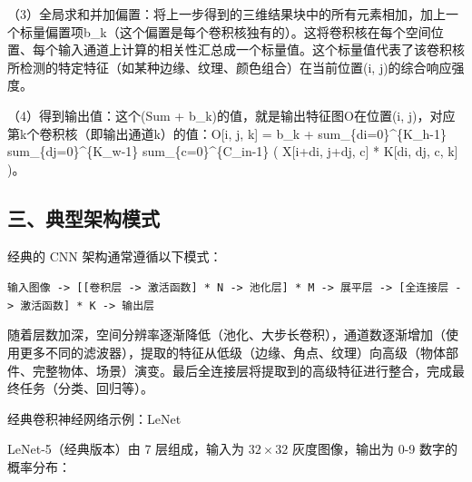（3）全局求和并加偏置：将上一步得到的三维结果块中的所有元素相加，加上一个标量偏置项b\_k（这个偏置是每个卷积核独有的）。这将卷积核在每个空间位置、每个输入通道上计算的相关性汇总成一个标量值。这个标量值代表了该卷积核所检测的特定特征（如某种边缘、纹理、颜色组合）在当前位置(i, j)的综合响应强度。

（4）得到输出值：这个(Sum + b\_k)的值，就是输出特征图O在位置(i, j)，对应第k个卷积核（即输出通道k）的值：O{[}i, j, k{]} = b\_k + sum\_\{di=0\}\^{}\{K\_h-1\} sum\_\{dj=0\}\^{}\{K\_w-1\} sum\_\{c=0\}\^{}\{C\_in-1\} ( X{[}i+di, j+dj, c{]} * K{[}di, dj, c, k{]} )。

\hypertarget{ux4e09ux5178ux578bux67b6ux6784ux6a21ux5f0f}{%
\subsection{三、典型架构模式}\label{ux4e09ux5178ux578bux67b6ux6784ux6a21ux5f0f}}

经典的 CNN 架构通常遵循以下模式：

\texttt{输入图像\ -\textgreater{}\ {[}{[}卷积层\ -\textgreater{}\ 激活函数{]}\ *\ N\ -\textgreater{}\ 池化层{]}\ *\ M\ -\textgreater{}\ 展平层\ -\textgreater{}\ {[}全连接层\ -\textgreater{}\ 激活函数{]}\ *\ K\ -\textgreater{}\ 输出层}

随着层数加深，空间分辨率逐渐降低（池化、大步长卷积），通道数逐渐增加（使用更多不同的滤波器），提取的特征从低级（边缘、角点、纹理）向高级（物体部件、完整物体、场景）演变。最后全连接层将提取到的高级特征进行整合，完成最终任务（分类、回归等）。

经典卷积神经网络示例：LeNet

LeNet-5（经典版本）由 7 层组成，输入为 \(32\times 32\) 灰度图像，输出为 0-9 数字的概率分布：


